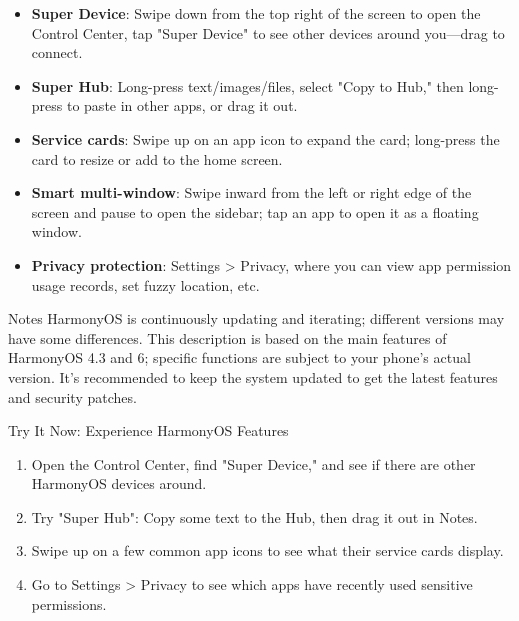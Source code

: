 
\begin{itemize}
  \item \textbf{Super Device}: Swipe down from the top right of the screen to open the Control Center, tap "Super Device" to see other devices around you—drag to connect.
  \item \textbf{Super Hub}: Long-press text/images/files, select "Copy to Hub," then long-press to paste in other apps, or drag it out.
  \item \textbf{Service cards}: Swipe up on an app icon to expand the card; long-press the card to resize or add to the home screen.
  \item \textbf{Smart multi-window}: Swipe inward from the left or right edge of the screen and pause to open the sidebar; tap an app to open it as a floating window.
  \item \textbf{Privacy protection}: Settings > Privacy, where you can view app permission usage records, set fuzzy location, etc.
\end{itemize}

\begin{tcbwarn}{Notes}
HarmonyOS is continuously updating and iterating; different versions may have some differences. This description is based on the main features of HarmonyOS 4.3 and 6; specific functions are subject to your phone's actual version. It's recommended to keep the system updated to get the latest features and security patches.

\end{tcbwarn}

\begin{tcbpractice}{Try It Now: Experience HarmonyOS Features}
\begin{enumerate}
  \item Open the Control Center, find "Super Device," and see if there are other HarmonyOS devices around.
  \item Try "Super Hub": Copy some text to the Hub, then drag it out in Notes.
  \item Swipe up on a few common app icons to see what their service cards display.
  \item Go to Settings > Privacy to see which apps have recently used sensitive permissions.
\end{enumerate}

\end{tcbpractice}
